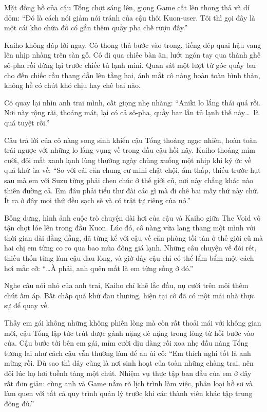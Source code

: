 \documentclass[../main.tex]{subfiles}
\begin{document}
Mặt đồng hồ của cậu Tổng chợt sáng lên, giọng Game cất lên thong thả và dí dỏm: ``Đó là cách nói giảm nói tránh của cậu thôi Kuon-user. Tôi thì gọi đây là một cái kho chứa đồ có gắn thêm quầy pha chế rượu đấy.''

Kaiho không đáp lời ngay. Cô thong thả bước vào trong, tiếng dép quai hậu vang lên nhịp nhàng trên sàn gỗ. Cô đi qua chiếc bàn ăn, lướt ngón tay qua thành ghế sô-pha rồi dừng lại trước chiếc tủ lạnh mini. Quan sát một lượt từ góc quầy bar cho đến chiếc cầu thang dẫn lên tầng hai, ánh mắt cô nàng hoàn toàn bình thản, không hề có chút khó chịu hay chê bai nào.

Cô quay lại nhìn anh trai mình, cất giọng nhẹ nhàng: ``Aniki lo lắng thái quá rồi. Nơi này rộng rãi, thoáng mát, lại có cả sô-pha, quầy bar lẫn tủ lạnh thế này\dots\ là quá tuyệt rồi.''

Câu trả lời của cô nàng song sinh khiến cậu Tổng thoáng ngạc nhiên, hoàn toàn trái ngược với những lo lắng vụng về trong đầu cậu hồi nãy. Kaiho thoáng mỉm cười, đôi mắt xanh lạnh lùng thường ngày chùng xuống một nhịp khi ký ức về quá khứ ùa về: ``So với cái căn chung cư mini chật chội, ẩm thấp, thiếu trước hụt sau mà em với Suzu từng phải chen chúc ở thế giới cũ, nơi này chẳng khác nào thiên đường cả. Em đâu phải tiểu thư đài các gì mà đi chê bai mấy thứ này chứ. Ít ra ở đây mọi thứ đều sạch sẽ và có trật tự riêng của nó.''

Bỗng dưng, hình ảnh cuộc trò chuyện dài hơi của cậu và Kaiho giữa The Void vô tận chợt lóe lên trong đầu Kuon. Lúc đó, cô nàng vừa lang thang một mình với thời gian dài đằng đẵng, đã từng kể với cậu về căn phòng tồi tàn ở thế giới cũ mà hai chị em từng co ro qua bao mùa đông giá lạnh. Những câu chuyện về đói rét, thiếu thốn từng làm cậu đau lòng, và giờ đây cậu chỉ có thể lẩm bẩm một cách hơi mắc cỡ: ``\dots À phải, anh quên mất là em từng sống ở đó.''

Nghe câu nói nhỏ của anh trai, Kaiho chỉ khẽ lắc đầu, nụ cười trên môi thêm chút ấm áp. Bất chấp quá khứ đau thương, hiện tại cô đã có một mái nhà thực sự để quay về.

Thấy em gái không những không phiền lòng mà còn rất thoải mái với không gian mới, cậu Tổng lập tức trút được gánh nặng đè nặng trong lòng từ hồi bước vào cửa. Cậu bước tới bên em gái, mỉm cười dịu dàng rồi xoa nhẹ đầu nàng Tổng tương lai như cách cậu vẫn thường làm để an ủi cô: ``Em thích nghi tốt là anh mừng rồi. Dù sao thì đây cũng là nơi sinh hoạt của toàn những chàng trai, nên đôi lúc họ hơi tuềnh tàng một chút. Nhiệm vụ thực tập ban đầu của em ở đây rất đơn giản: cùng anh và Game nắm rõ lịch trình làm việc, phân loại hồ sơ và làm quen với tất cả quy trình quản lý trước khi các thành viên khác tập trung đông đủ.''
\end{document}
